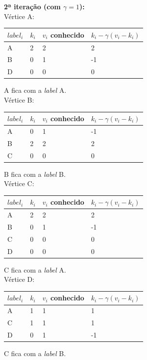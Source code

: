 \documentclass[a4paper,10pt]{report}
\begin{document}
  \newpage
  
  {\bf 2ª iteração (com $\gamma=1$):}
\\[0.25cm]
Vértice A:
  \begin{tabular}{| l | l | l | l |}
  \hline
  $label_i$ & $k_i$ & $v_i$ conhecido & $k_i - \gamma(v_i - k_i)$\\ \hline
  A & 2 & 2 & 2 \\ \hline
  B & 0 & 1 & -1 \\ \hline
  D & 0 & 0 & 0 \\ \hline
  \end{tabular}
  A fica com a \textit{label} A.
\\[0.25cm]
Vértice B:
  \begin{tabular}{| l | l | l | l |}
  \hline
  $label_i$ & $k_i$ & $v_i$ conhecido & $k_i - \gamma(v_i - k_i)$\\ \hline
  A & 0 & 1 & -1 \\ \hline
  B & 2 & 2 & 2 \\ \hline
  C & 0 & 0 & 0 \\ \hline
  \end{tabular}
  B fica com a \textit{label} B.
\\[0.25cm]
Vértice C:
  \begin{tabular}{| l | l | l | l |}
  \hline
  $label_i$ & $k_i$ & $v_i$ conhecido & $k_i - \gamma(v_i - k_i)$\\ \hline
  A & 2 & 2 & 2 \\ \hline
  B & 0 & 1 & -1 \\ \hline
  C & 0 & 0 & 0 \\ \hline
  D & 0 & 0 & 0 \\ \hline
  \end{tabular}
  C fica com a \textit{label} A.
\\[0.25cm]
Vértice D:
  \begin{tabular}{| l | l | l | l |}
  \hline
  $label_i$ & $k_i$ & $v_i$ conhecido & $k_i - \gamma(v_i - k_i)$\\ \hline
  A & 1 & 1 & 1 \\ \hline
  C & 1 & 1 & 1 \\ \hline
  D & 0 & 1 & -1 \\ \hline
  \end{tabular}
  C fica com a \textit{label} B.
  
  
  
\end{document}
